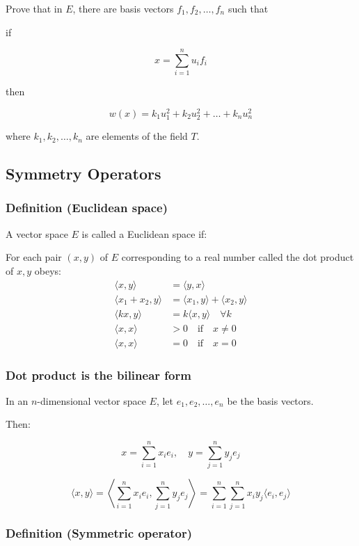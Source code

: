 Prove that in $E$, there are basis vectors $f_1, f_2, \ldots, f_n$ such that

if

\[
x = \sum_{i=1}^n u_i f_i
\]

then

\[
w(x) = k_1 u_1^2 + k_2 u_2^2 + \ldots + k_n u_n^2
\]

where $k_1, k_2, \ldots, k_n$ are elements of the field $T$.




\subsection{Symmetry Operators}

\subsubsection{Definition (Euclidean space)}

A vector space $E$ is called a Euclidean space if:

For each pair $(x, y)$ of $E$ corresponding to a real number called the dot product of $x, y$ obeys:
\begin{align*}
    \langle x, y \rangle &= \langle y, x \rangle\\
    \langle x_1 + x_2, y \rangle &= \langle x_1, y \rangle + \langle x_2, y \rangle\\
    \langle kx, y \rangle &= k \langle x, y \rangle \quad \forall k\\
    \langle x, x \rangle &> 0 \quad \text{if} \quad x \neq 0\\
    \langle x, x \rangle &= 0 \quad \text{if} \quad x = 0
\end{align*}

\subsubsection{Dot product is the bilinear form}

In an $n$-dimensional vector space $E$, let $e_1, e_2, \ldots, e_n$ be the basis vectors.

Then:

\[
x = \sum_{i=1}^n x_i e_i, \quad y = \sum_{j=1}^n y_j e_j
\]

\[
\langle x, y \rangle = \left\langle \sum_{i=1}^n x_i e_i, \sum_{j=1}^n y_j e_j \right\rangle = \sum_{i=1}^n \sum_{j=1}^n x_i y_j \langle e_i, e_j \rangle
\]

\subsubsection{Definition (Symmetric operator)}

